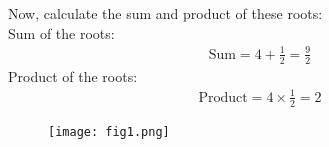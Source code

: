\documentclass[journal]{IEEEtran}
\begin{document}
Now, calculate the sum and product of these roots:\\
Sum of the roots:
\begin{align}
\text{Sum} = 4 + \frac{1}{2} = \frac{9}{2}
\end{align}
Product of the roots:
\begin{align}
\text{Product} = 4 \times \frac{1}{2} = 2
\end{align}

\begin{figure}[H]
\centering
\texttt{[image: fig1.png]}
\caption{}
\label{fig:1}
\end{figure}
\end{document}
